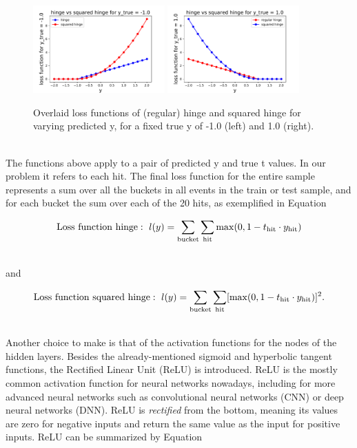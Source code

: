 \begin{figure}[htb]
\centering
\includegraphics[width=0.45\textwidth]{plots/LossFunctions_MinusOne.pdf}
\includegraphics[width=0.45\textwidth]{plots/LossFunctions_PlusOne.pdf}
\caption{Overlaid loss functions of (regular) hinge and squared hinge for varying predicted y, for a fixed true y of -1.0 (left) and 1.0 (right).}
\label{fig:LossFunctions}
\end{figure}

\ \\The functions above apply to a pair of predicted y and true t values. In our problem it refers to each hit. The final loss function for the entire sample represents a sum over all the buckets in all events in the train or test sample, and for each bucket the sum over each of the 20 hits, as exemplified in Equation

\begin{equation}
   \LossFunctionHinge:~l(y) = \sum_{\rm bucket} \sum_{\rm hit} \max(0, 1 - t_{\rm hit} \cdot y_{\rm hit})
\end{equation}

\ \\ and

\begin{equation}
   \LossFunctionSquaredHinge:~l(y) = \sum_{\rm bucket} \sum_{\rm hit} [\max(0, 1 - t_{\rm hit} \cdot y_{\rm hit})]^2.
\end{equation}

\ \\Another choice to make is that of the activation functions for the nodes of the hidden layers. Besides the already-mentioned sigmoid and hyperbolic tangent functions, the Rectified Linear Unit (ReLU) is introduced. ReLU is the mostly common activation function for neural networks nowadays, including for more advanced neural networks such as convolutional neural networks (CNN) or deep neural networks (DNN). ReLU is \emph{rectified} from the bottom, meaning its values are zero for negative inputs and return the same value as the input for positive inputs. ReLU can be summarized by Equation

